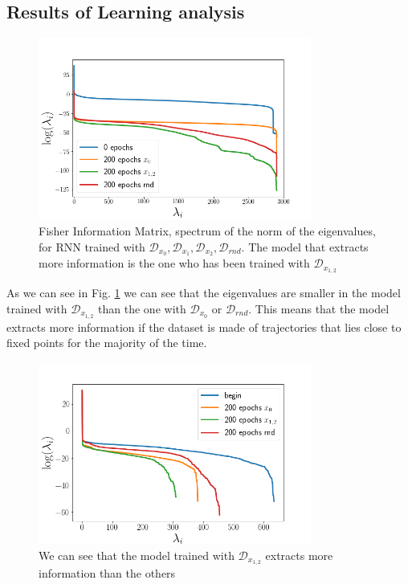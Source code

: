 \documentclass{article}
\begin{document}
\subsection{Results of Learning analysis}

\begin{figure}[h]
    \centering
    \includegraphics[width=0.8\textwidth]{images/FIM_different_fixed_points_rand.png}
    
    \caption{Fisher Information Matrix, spectrum of the norm of the eigenvalues, for RNN trained with $\mathcal{D}_{x_{0}},\mathcal{D}_{x_{1}},\mathcal{D}_{x_{2}},\mathcal{D}_{rnd}$. The model that extracts more information is the one who has been trained with $\mathcal{D}_{x_{1,2}}$}
    \label{fig:FIM_RNN}
\end{figure}
As we can see in Fig. \ref{fig:FIM_RNN} we can see that the eigenvalues are smaller in the model trained with $\mathcal{D}_{x_{1,2}}$ than the one with $\mathcal{D}_{x_0}$ or $\mathcal{D}_{rnd}$. This means that the model extracts more information if the dataset is made of trajectories that lies close to fixed points for the majority of the time.

\begin{figure}[h]
    \centering
    \includegraphics[width=0.8\textwidth]{images/FIM_MLP700_fixedVSrandom_0_200ep.png}
    \caption{We can see that the model trained with $\mathcal{D}_{x_{1,2}}$ extracts more information than the others}
    \label{fig:MLP_points}
\end{figure}
\end{document}
